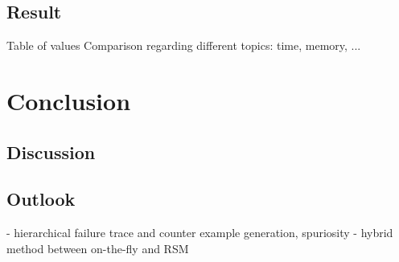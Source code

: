 \documentclass[a4paper, 12pt, twoside]{report}
\begin{document}
	\section{Result}
	Table of values
	Comparison regarding different topics: time, memory, ...
	
	\chapter{Conclusion}
	
	\section{Discussion}
		
	\section{Outlook}
	
		- hierarchical failure trace and counter example generation, spuriosity
	- hybrid method between on-the-fly and RSM
	
	
	{}
	
\end{document}

